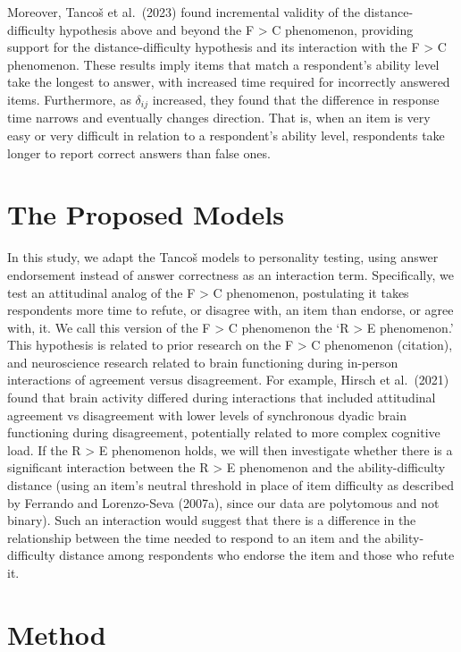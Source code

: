\documentclass[
]{agujournal2019}
\begin{document}
Moreover, Tancoš et al.~(2023) found incremental validity of the
distance-difficulty hypothesis above and beyond the F \textgreater{} C
phenomenon, providing support for the distance-difficulty hypothesis and
its interaction with the F \textgreater{} C phenomenon. These results
imply items that match a respondent's ability level take the longest to
answer, with increased time required for incorrectly answered items.
Furthermore, as \(\delta_{ij}\) increased, they found that the
difference in response time narrows and eventually changes direction.
That is, when an item is very easy or very difficult in relation to a
respondent's ability level, respondents take longer to report correct
answers than false ones.

\section{The Proposed Models}\label{the-proposed-models}

In this study, we adapt the Tancoš models to personality testing, using
answer endorsement instead of answer correctness as an interaction term.
Specifically, we test an attitudinal analog of the F \textgreater{} C
phenomenon, postulating it takes respondents more time to refute, or
disagree with, an item than endorse, or agree with, it. We call this
version of the F \textgreater{} C phenomenon the `R \textgreater{} E
phenomenon.' This hypothesis is related to prior research on the F
\textgreater{} C phenomenon (citation), and neuroscience research
related to brain functioning during in-person interactions of agreement
versus disagreement. For example, Hirsch et al.~(2021) found that brain
activity differed during interactions that included attitudinal
agreement vs disagreement with lower levels of synchronous dyadic brain
functioning during disagreement, potentially related to more complex
cognitive load. If the R \textgreater{} E phenomenon holds, we will then
investigate whether there is a significant interaction between the R
\textgreater{} E phenomenon and the ability-difficulty distance (using
an item's neutral threshold in place of item difficulty as described by
Ferrando and Lorenzo-Seva (2007a), since our data are polytomous and not
binary). Such an interaction would suggest that there is a difference in
the relationship between the time needed to respond to an item and the
ability-difficulty distance among respondents who endorse the item and
those who refute it.

\section{Method}\label{method}
\end{document}
